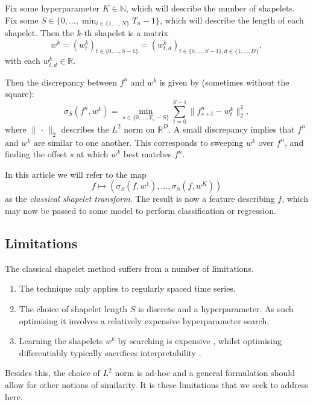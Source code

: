 \documentclass{article}
\theoremstyle{plain}
\theoremstyle{definition}
\newcommand{\reals}{\mathbb{R}}
\newcommand{\naturals}{\mathbb{N}}
\newcommand{\norm}[1]{\|#1\|}
\begin{document}
	Fix some hyperparameter $K \in \naturals$, which will describe the number of shapelets. Fix some $S \in \{0, \ldots, \min_{i \in \{1, \ldots, N\}}T_n - 1\}$, which will describe the length of each shapelet. Then the $k$-th shapelet is a matrix
	\begin{equation*}
	w^{k} = (w^{k}_t)_{t \in \{0, \ldots, S - 1\}} = (w^{k}_{t, d})_{t \in \{0, \ldots, S - 1\}, d \in \{1, \ldots, D\}},
	\end{equation*}
	with each $w^{k}_{t, d} \in \reals$.
	
	Then the discrepancy between $f^n$ and $w^{k}$ is given by (sometimes without the square):
	\begin{equation}\label{eq:classical-shapelets}
	\sigma_S(f^n, w^{k}) = \min_{s \in \{0, \ldots, T_n - S\}} \sum_{t = 0}^{S - 1} \norm{f^n_{s + t} - w^{k}_t}_2^2,
	\end{equation}
	where $\norm{\,\cdot\,}_2$ describes the $L^2$ norm on $\reals^D$. A small discrepancy implies that $f^n$ and $w^{k}$ are similar to one another. This corresponds to sweeping $w^{k}$ over $f^n$, and finding the offset $s$ at which $w^{k}$ best matches $f^n$.
	
	In this article we will refer to the map
	\begin{equation}\label{eq:classical-shapelet-transform}
	f \mapsto (\sigma_S(f, w^{1}), \ldots, \sigma_S(f, w^{K}))
	\end{equation}
	as the \emph{classical shapelet transform}. The result is now a feature describing $f$, which may now be passed to some model to perform classification or regression.
	
	\subsection{Limitations}
	The classical shapelet method suffers from a number of limitations.
	\begin{enumerate}
	\item The technique only applies to regularly spaced time series.
	\item The choice of shapelet length $S$ is discrete and a hyperparameter. As such optimising it involves a relatively expensive hyperparameter search.
	\item Learning the shapelets $w^{k}$ by searching is expensive \cite{ye2009firstshapelet}, whilst optimising differentiably \cite{grabocka2014learningshapelet} typically sacrifices interpretability \cite{wang2019interp}.
	\end{enumerate}
	Besides this, the choice of $L^2$ norm is ad-hoc and a general formulation should allow for other notions of similarity. It is these limitations that we seek to address here.
	
\end{document}
